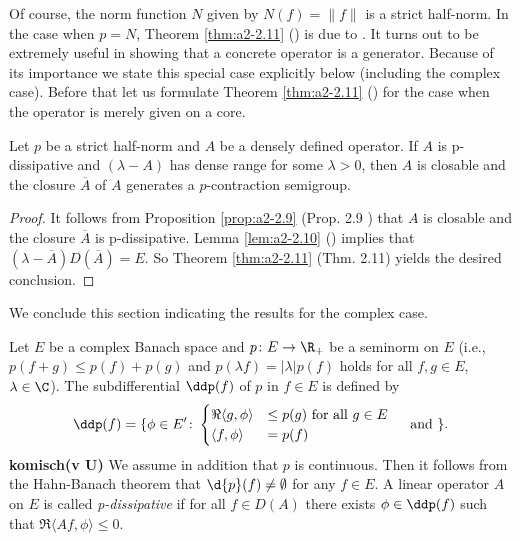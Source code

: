 Of course, the norm function $N$ given by $N(f) = \|f\|$ is a strict half-norm.
In the case when $p = N$, Theorem \ref{thm:a2-2.11} ()  
is due to \citet{lumerandphillips:1961}.
It turns out to be extremely useful in showing that a concrete operator is a generator.
Because of its importance we state this special case explicitly below (including the complex case).
Before that let us formulate Theorem \ref{thm:a2-2.11} () 
for the case when the operator is merely given on a core.

\begin{corollary}\label{cor:a2-2.12}
Let $p$ be a strict half-norm and $A$ be a densely defined operator.
If $A$ is p-dissipative and $(\lambda - A)$ has dense range for some $\lambda > 0$, then $A$ is closable and the closure $\overline{A}$ of $A$ generates a $p$-contraction semigroup.
\end{corollary}
\begin{proof}
It follows from Proposition \ref{prop:a2-2.9} (\lnm Prop. 2.9 )
that $A$ is closable and the closure $\overline{A}$ is p-dissipative.
Lemma \ref{lem:a2-2.10} () 
implies that $(\lambda- \overline{A})D(\overline{A}) = E$.
So Theorem \ref{thm:a2-2.11} (\lnm Thm. 2.11) 
yields the desired conclusion.
\end{proof}
We conclude this section indicating the results for the complex case.

Let $E$ be a complex Banach space and $p \colon E \to \R_{+}$ 
be a seminorm on $E$ (i.e., $p(f + g) \leq p(f) + p(g)$ and $p(\lambda f) = |\lambda|p(f)$ holds for all $f, g \in E$, $\lambda \in \C$).
The subdifferential $\ddp(f)$ of $p$ in $f \in E$ is defined by
\begin{equation}\label{eq:a2-4.15}
\ddp(f) = \{\phi \in E' \colon \begin{cases} \Re\langle g,\phi \rangle &\leq p(g) \text{ for all } g \in E \\ \langle f,\phi \rangle &= p(f) \end{cases} \quad \text{ and } \}.
\end{equation}
\textbf{komisch(v U)}
We assume in addition that $p$ is continuous.
Then it follows from the Hahn-Banach theorem that $\d{p}(f) \neq \emptyset$ for any $f \in E$.
A linear operator $A$ on $E$ is called \emph{p-dissipative} if for all $f \in D(A)$ there exists $\phi \in \ddp(f)$ such that $\Re\langle Af,\phi \rangle \leq 0$.

